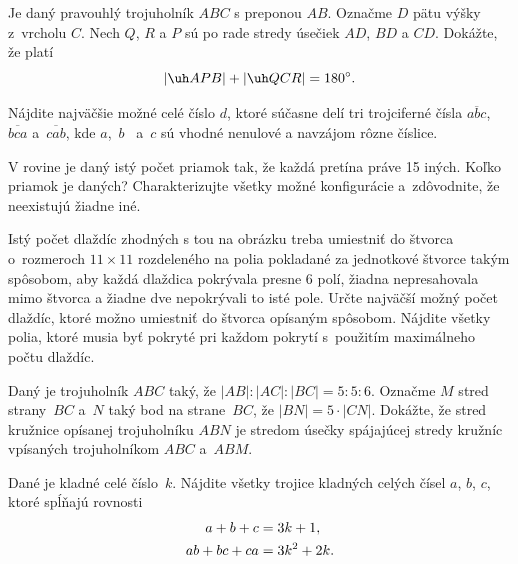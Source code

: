{%
Je daný pravouhlý trojuholník $ABC$ s preponou $AB$. Označme $D$ pätu výšky z~vrcholu $C$. Nech $Q$, $R$ a $P$ sú po rade stredy úsečiek $AD$, $BD$ a $CD$. Dokážte, že platí
$$
|\uh APB|+|\uh QCR|=180^{\circ}.
$$
}

{%
Nájdite najväčšie možné celé číslo $d$, ktoré súčasne delí tri trojciferné čísla $\overline{abc}$, $\overline{bca}$ a~$\overline{cab}$, kde $a$,~$b$~ a~$c$ sú vhodné nenulové a navzájom rôzne číslice.
}

{%
V rovine je daný istý počet priamok tak, že každá pretína práve 15 iných. Koľko priamok je daných? Charakterizujte všetky možné konfigurácie a~zdôvodnite, že neexistujú žiadne iné.
}

{%
Istý počet dlaždíc zhodných s tou na obrázku treba umiestniť do štvorca o~rozmeroch $11\times 11$ rozdeleného na polia pokladané za jednotkové štvorce takým spôsobom, aby každá dlaždica pokrývala presne $6$ polí, žiadna nepresahovala mimo štvorca a žiadne dve nepokrývali to isté pole.
 Určte najväčší možný počet dlaždíc, ktoré možno umiestniť do štvorca opísaným spôsobom.
 Nájdite všetky polia, ktoré musia byť pokryté pri každom pokrytí s~použitím maximálneho počtu dlaždíc.\endgraf
%
}

{%
Daný je trojuholník $ABC$ taký, že $|AB|:|AC|:|BC| = 5:5:6$. Označme $M$ stred strany~$BC$ a~$N$ taký bod na strane~$BC$, že $|BN| = 5\cdot|CN|$. Dokážte, že stred kružnice opísanej trojuholníku $ABN$ je stredom úsečky spájajúcej stredy kružníc vpísaných trojuholníkom $ABC$ a~$ABM$.
}

{%
Dané je kladné celé číslo~$k$. Nájdite všetky trojice kladných celých čísel $a$, $b$, $c$, ktoré spĺňajú rovnosti
$$
\aligned
a+b+c&=3k+1,\\
ab+bc+ca&=3k^2+2k.
\endaligned
$$
}
